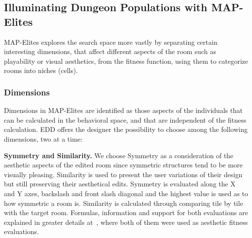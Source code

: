 \documentclass[conference]{IEEEtran}
\begin{document}
\subsection{Illuminating Dungeon Populations with MAP-Elites}

MAP-Elites explores the search space more vastly by separating certain interesting dimensions, that affect different aspects of the room such as playability or visual aesthetics, from the fitness function, using them to categorize rooms into niches (cells). %

\subsubsection{Dimensions}

Dimensions in MAP-Elites are identified as those aspects of the individuals that can be calculated in the behavioral space, and that are independent of the fitness calculation. %
EDD offers the designer the possibility to choose among the following dimensions, two at a time:

\textbf{Symmetry and Similarity.} We choose Symmetry as a consideration of the aesthetic aspects of the edited room since symmetric structures tend to be more visually pleasing. Similarity is used to present the user variations of their design but still preserving their aesthetical edits. Symmetry is evaluated along the X and Y axes, backslash and front slash diagonal and the highest value is used as to how symmetric a room is. Similarity is calculated through comparing tile by tile with the target room. Formulas, information and support for both evaluations are explained in greater details at~\cite{Alvarez2018a}, where both of them were used as aesthetic fitness evaluations.
\end{document}
